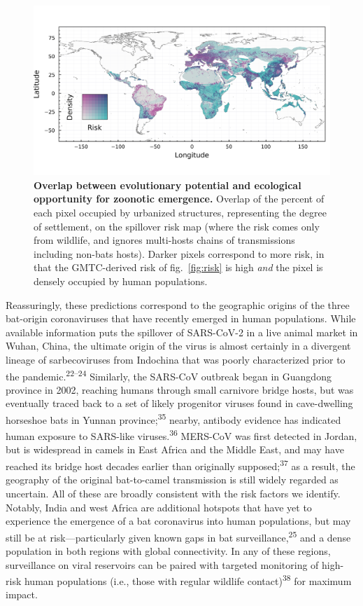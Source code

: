 \documentclass[10pt,oneside]{article}
\makeatletter
\def\maxwidth{\ifdim\Gin@nat@width>\linewidth\linewidth
\else\Gin@nat@width\fi}
\let\Oldincludegraphics\includegraphics
\renewcommand{\includegraphics}[1]{\Oldincludegraphics[width=\maxwidth]{#1}}
\makeatother
\begin{document}
\begin{figure}
\hypertarget{fig:compound}{%
\centering
\includegraphics{figures/risk_compounded.png}
\caption{\textbf{Overlap between evolutionary potential and ecological
opportunity for zoonotic emergence.} Overlap of the percent of each
pixel occupied by urbanized structures, representing the degree of
settlement, on the spillover risk map (where the risk comes only from
wildlife, and ignores multi-hosts chains of transmissions including
non-bats hosts). Darker pixels correspond to more risk, in that the
GMTC-derived risk of fig.~\ref{fig:risk} is high \emph{and} the pixel is
densely occupied by human populations.}\label{fig:compound}
}
\end{figure}

Reassuringly, these predictions correspond to the geographic origins of
the three bat-origin coronaviruses that have recently emerged in human
populations. While available information puts the spillover of
SARS-CoV-2 in a live animal market in Wuhan, China, the ultimate origin
of the virus is almost certainly in a divergent lineage of
sarbecoviruses from Indochina that was poorly characterized prior to the
pandemic.\textsuperscript{22--24} Similarly, the SARS-CoV outbreak began
in Guangdong province in 2002, reaching humans through small carnivore
bridge hosts, but was eventually traced back to a set of likely
progenitor viruses found in cave-dwelling horseshoe bats in Yunnan
province;\textsuperscript{35} nearby, antibody evidence has indicated
human exposure to SARS-like viruses.\textsuperscript{36} MERS-CoV was
first detected in Jordan, but is widespread in camels in East Africa and
the Middle East, and may have reached its bridge host decades earlier
than originally supposed;\textsuperscript{37} as a result, the geography
of the original bat-to-camel transmission is still widely regarded as
uncertain. All of these are broadly consistent with the risk factors we
identify. Notably, India and west Africa are additional hotspots that
have yet to experience the emergence of a bat coronavirus into human
populations, but may still be at risk---particularly given known gaps in
bat surveillance,\textsuperscript{25} and a dense population in both
regions with global connectivity. In any of these regions, surveillance
on viral reservoirs can be paired with targeted monitoring of high-risk
human populations (i.e., those with regular wildlife
contact)\textsuperscript{38} for maximum impact.
\end{document}
